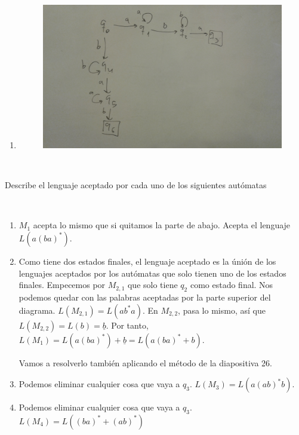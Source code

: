 \documentclass[twoside]{article}
\begin{document}
\begin{solucion}
\begin{enumerate}
\item 

\begin{figure}[h!]
\includegraphics[scale=0.1]{Automatas/1-4}
\end{figure}\
\end{enumerate}
\end{solucion}

\newpage

\begin{ejercicio}{2}
Describe el lenguaje aceptado por cada uno de los siguientes autómatas
\end{ejercicio}
\begin{solucion}\
\begin{enumerate}
\item $M_1$  acepta lo mismo que si quitamos la parte de abajo. Acepta el lenguaje $L(a(ba)^*)$.
\item Como tiene dos estados finales, el lenguaje aceptado es la únión de los lenguajes aceptados por los autómatas que solo tienen uno de los estados finales. Empecemos por $M_{2,1}$ que solo tiene $q_2$ como estado final. Nos podemos quedar con las palabras aceptadas por la parte superior del diagrama. $L(M_{2,1})=L(ab^*a)$. En $M_{2,2}$, pasa lo mismo, así que $L(M_{2,2})=L(b)=\underline{b}$. Por tanto, $L(M_1)=L(a(ba)^*)+\underline{b}=L(a(ba)^*+b)$.

Vamos a resolverlo también aplicando el método de la diapositiva 26.

\item Podemos eliminar cualquier cosa que vaya a $q_3$. $L(M_3)=L(a(ab)^*b)$. 

\item Podemos eliminar cualquier cosa que vaya a $q_3$. $L(M_4)=L((ba)^*+(ab)^*)$
\end{enumerate}
\end{solucion}
\end{document}
